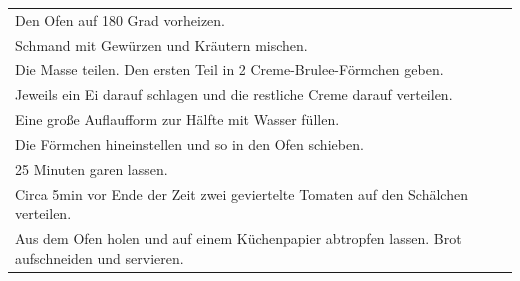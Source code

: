 \begin{tabular}{p{15cm}}
	\\
  Den Ofen auf 180 Grad vorheizen.\\
  Schmand mit Gewürzen und Kräutern mischen. \\
  Die Masse teilen. Den ersten Teil in 2 Creme-Brulee-Förmchen geben.\\
  Jeweils ein Ei darauf schlagen und die restliche Creme darauf verteilen. \\
  Eine große Auflaufform zur Hälfte mit Wasser füllen. \\
  Die Förmchen hineinstellen und so in den Ofen schieben.\\
  25 Minuten garen lassen.\\
  Circa 5min vor Ende der Zeit zwei geviertelte Tomaten auf den Schälchen verteilen.\\
  Aus dem Ofen holen und auf einem Küchenpapier abtropfen lassen. Brot aufschneiden und servieren.
\end{tabular}
